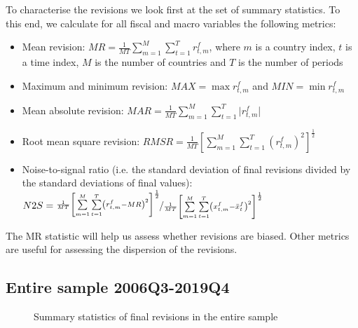 
To characterise the revisions we look first at the set of summary
statistics. To this end, we calculate for all fiscal and macro variables the following metrics:
\begin{itemize}
\item Mean revision: $MR=\frac{1}{MT}\sum\limits_{m=1}^{M}\sum\limits_{t=1}^{T}r_{t,m}^{f}$, where $m$ is a country index, $t$ is a time index, $M$ is the number of countries and $T$ is the number of periods
\item Maximum and minimum revision: $MAX=\max{r_{t,m}^{f}}$ and $MIN=\min{r_{t,m}^{f}}$
\item Mean absolute revision: $MAR=\frac{1}{MT}\sum\limits_{m=1}^{M}\sum\limits_{t=1}^{T}|r_{t,m}^{f}$|
\item Root mean square revision: $RMSR=\frac{1}{MT}\left[\sum\limits_{m=1}^{M}\sum\limits_{t=1}^{T}\left(r_{t,m}^{f}\right)^{2}\right]^{\frac{1}{2}}$
\item Noise-to-signal ratio (i.e. the standard deviation of final revisions
divided by the standard deviations of final values): $N2S=\nicefrac{\frac{1}{MT}\left[\sum\limits_{m=1}^{M}\sum\limits_{t=1}^{T}\left(r_{t,m}^{f}-MR\right)^{2}\right]^{\frac{1}{2}}}{\frac{1}{MT}\left[\sum\limits_{m=1}^{M}\sum\limits_{t=1}^{T}\left(x_{t,m}^{f}-\bar{x}_{t}^{f}\right)^{2}\right]^{\frac{1}{2}}}$
\end{itemize}

The MR statistic will help us assess whether revisions are biased. Other metrics are useful for assessing the dispersion of the revisions.

\subsection{Entire sample 2006Q3-2019Q4}


\begin{figure}[H]
\begin{centering}
\caption{Summary statistics of final revisions in the entire sample \label{fig:FinRevGItems}}
\par\end{centering}
\centering


\end{figure}

